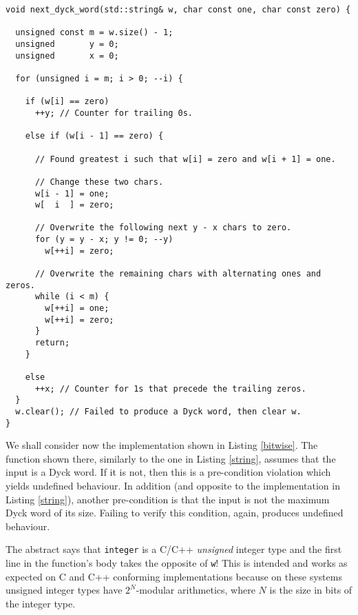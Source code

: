 \documentclass[a4paper]{article}
\begin{document}
\begin{lstlisting}[float,caption={String manipulation to generate a Dyck word.},label=string]
void next_dyck_word(std::string& w, char const one, char const zero) {

  unsigned const m = w.size() - 1;
  unsigned       y = 0;
  unsigned       x = 0;

  for (unsigned i = m; i > 0; --i) {

    if (w[i] == zero)
      ++y; // Counter for trailing 0s.

    else if (w[i - 1] == zero) {

      // Found greatest i such that w[i] = zero and w[i + 1] = one.

      // Change these two chars.
      w[i - 1] = one;
      w[  i  ] = zero;

      // Overwrite the following next y - x chars to zero.
      for (y = y - x; y != 0; --y)
        w[++i] = zero;

      // Overwrite the remaining chars with alternating ones and zeros.
      while (i < m) {
        w[++i] = one;
        w[++i] = zero;
      }
      return;
    }

    else
      ++x; // Counter for 1s that precede the trailing zeros.
  }
  w.clear(); // Failed to produce a Dyck word, then clear w.
}
\end{lstlisting}

We shall consider now the implementation shown in Listing \ref{bitwise}.
The function shown there, similarly to the one in Listing \ref{string}, assumes that the input is a Dyck word.
If it is not, then this is a pre-condition violation which yields undefined behaviour.
In addition (and opposite to the implementation in Listing \ref{string}), another pre-condition is that the input is not the maximum Dyck word of its size.
Failing to verify this condition, again, produces undefined behaviour.


The abstract says that \verb!integer! is a C/C++ {\em unsigned} integer type and the first line in the function's body takes the opposite of \verb!w!!
This is intended and works as expected on C and C++ conforming implementations because on these systems unsigned integer types have $2^N$-modular arithmetics, where $N$ is the size in bits of the integer type.
\end{document}
